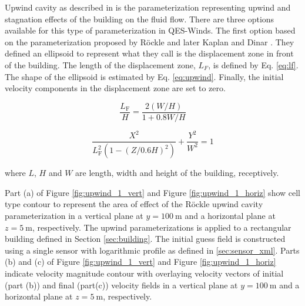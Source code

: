 Upwind cavity as described in \cite{nelson20085,bagal2004improved, gowardhan2010evaluation} is the parameterization representing upwind and stagnation effects of the building on the fluid flow. There are three options available for this type of parameterization in QES-Winds. The first option based on the parameterization proposed by R\"{o}ckle \cite{rockle1990bestimmung} and later Kaplan and Dinar \cite{kaplan1996lagrangian}. They defined an ellipsoid to represent what they call is the displacement zone in front of the building. The length of the displacement zone, $L_F$, is defined by Eq. \ref{eq:lf}. The shape of the ellipsoid is estimated by Eq. \ref{eq:upwind}. Finally, the initial velocity components in the displacement zone are set to zero.

\begin{equation}
\frac{L_{\mathrm{F}}}{H}=\frac{2(W / H)}{1+0.8 W / H}
\label{eq:lf}
\end{equation}

\begin{equation}
\frac{X^{2}}{L_{\mathrm{F}}^{2}\left(1-(Z / 0.6 H)^{2}\right)}+\frac{Y^{2}}{W^{2}}=1
\label{eq:upwind}
\end{equation}

where $L$, $H$ and $W$ are length, width and height of the building, receptively.

Part (a) of Figure \ref{fig:upwind_1_vert} and Figure \ref{fig:upwind_1_horiz} show cell type contour to represent the area of effect of the R\"{o}ckle upwind cavity parameterization in a vertical plane at $y=100\ \si{\meter}$ and a horizontal plane at $z=5\ \si{\meter}$, respectively. The upwind parameterizations is applied to a rectangular building defined in Section \ref{sec:building}. The initial guess field is constructed using a single sensor with logarithmic profile as defined in \ref{sec:sensor_xml}. Parts (b) and (c) of Figure \ref{fig:upwind_1_vert} and Figure \ref{fig:upwind_1_horiz} indicate velocity magnitude contour with overlaying velocity vectors of initial (part (b)) and final (part(c)) velocity fields in a vertical plane at $y=100\ \si{\meter}$ and a horizontal plane at $z=5\ \si{\meter}$, respectively.

